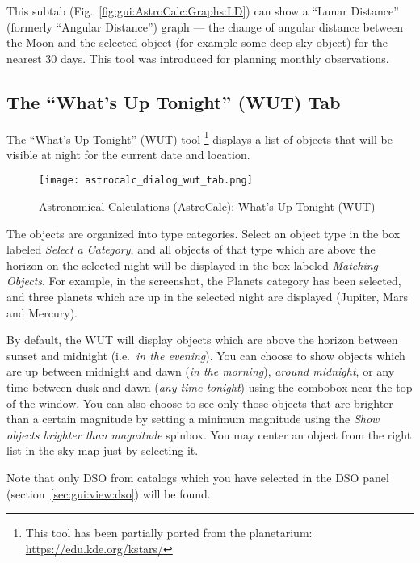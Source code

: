This subtab (Fig.~\ref{fig:gui:AstroCalc:Graphs:LD})
 can show a ``Lunar Distance'' (formerly ``Angular
Distance'') graph --- the change of angular distance between the Moon
and the selected object (for example some deep-sky object) for the
nearest 30 days. This tool was introduced for planning monthly
observations.

\subsection{The ``What's Up Tonight'' (WUT) Tab}
\label{sec:gui:AstroCalc:WUT}

The ``What's Up Tonight'' (WUT) tool%
	\footnote{This tool has been partially ported from the  planetarium: \url{https://edu.kde.org/kstars/}}
 displays a list of objects that will be visible at night for the current date and location.

\begin{figure}[tbp]
\centering\texttt{[image: astrocalc\_dialog\_wut\_tab.png]}
\caption{Astronomical Calculations (AstroCalc): What's Up Tonight (WUT)}
\label{fig:gui:AstroCalc:WUT}
\end{figure}

The objects are organized into type categories. Select an object type in the box labeled 
\emph{Select a Category}, and all objects of that type which are above the horizon on the selected night 
will be displayed in the box labeled \emph{Matching Objects}. For example, in the screenshot, 
the Planets category has been selected, and three planets which are up in the selected night are displayed (Jupiter, Mars and Mercury). 

By default, the WUT will display objects which are above the horizon between sunset and midnight (i.e.\ \emph{in the evening}). 
You can choose to show objects which are up between midnight and dawn (\emph{in the morning}), 
\emph{around midnight}, 
or any time between dusk and dawn (\emph{any time tonight}) using the combobox near the top of the window. 
You can also choose to see only those objects that are brighter than a certain magnitude by 
setting a minimum magnitude using the \emph{Show objects brighter than magnitude} spinbox. 
You may center an object from the right list in the sky map just by selecting it.

Note that only DSO from catalogs which you have selected in the DSO panel (section~\ref{sec:gui:view:dso}) will be found.


